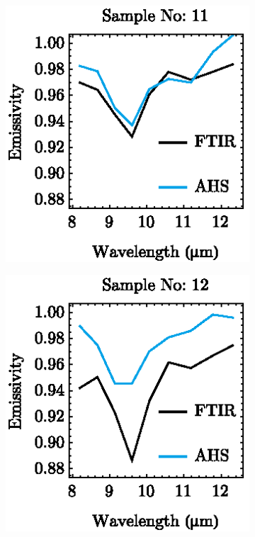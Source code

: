 \begin{appendices}
\begin{figure}[!t]
	\centering
	\vspace{1em}
	\begin{subfigure}[t]{.3\linewidth}
		\centering
		\includegraphics[scale=1]{pics/Chapter_05/Sample_no_11.eps}
		\caption{}
	\end{subfigure}
	\hspace{1em}
	\begin{subfigure}[t]{.3\linewidth}
		\centering
		\includegraphics[scale=1]{pics/Chapter_05/Sample_no_12.eps}
		\caption{}
	\end{subfigure}
	\hspace{1em}
	\begin{subfigure}[t]{.3\linewidth}
		\centering

\end{subfigure}
\end{figure}
\end{appendices}
